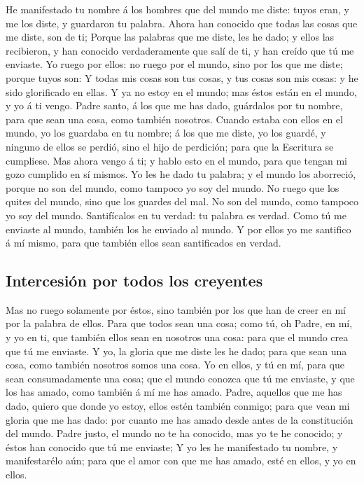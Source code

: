  He manifestado tu nombre á los hombres que del mundo me
diste: tuyos eran, y me los diste, y guardaron tu palabra. 
Ahora han conocido que todas las cosas que me diste, son de ti;
 Porque las palabras que me diste, les he dado; y ellos las
recibieron, y han conocido verdaderamente que salí de ti, y han creído
que tú me enviaste.  Yo ruego por ellos: no ruego por el
mundo, sino por los que me diste; porque tuyos son:  Y
todas mis cosas son tus cosas, y tus cosas son mis cosas: y he sido
glorificado en ellas.  Y ya no estoy en el mundo; mas éstos
están en el mundo, y yo á ti vengo. Padre santo, á los que me has dado,
guárdalos por tu nombre, para que sean una cosa, como también nosotros.
 Cuando estaba con ellos en el mundo, yo los guardaba en tu
nombre; á los que me diste, yo los guardé, y ninguno de ellos se perdió,
sino el hijo de perdición; para que la Escritura se cumpliese.
 Mas ahora vengo á ti; y hablo esto en el mundo, para que
tengan mi gozo cumplido en sí mismos.  Yo les he dado tu
palabra; y el mundo los aborreció, porque no son del mundo, como tampoco
yo soy del mundo.  No ruego que los quites del mundo, sino
que los guardes del mal.  No son del mundo, como tampoco yo
soy del mundo.  Santifícalos en tu verdad: tu palabra es
verdad.  Como tú me enviaste al mundo, también los he
enviado al mundo.  Y por ellos yo me santifico á mí mismo,
para que también ellos sean santificados en verdad.

\hypertarget{intercesiuxf3n-por-todos-los-creyentes}{%
\subsection{Intercesión por todos los
creyentes}\label{intercesiuxf3n-por-todos-los-creyentes}}

 Mas no ruego solamente por éstos, sino también por los que
han de creer en mí por la palabra de ellos.  Para que todos
sean una cosa; como tú, oh Padre, en mí, y yo en ti, que también ellos
sean en nosotros una cosa: para que el mundo crea que tú me enviaste.
 Y yo, la gloria que me diste les he dado; para que sean
una cosa, como también nosotros somos una cosa.  Yo en
ellos, y tú en mí, para que sean consumadamente una cosa; que el mundo
conozca que tú me enviaste, y que los has amado, como también á mí me
has amado.  Padre, aquellos que me has dado, quiero que
donde yo estoy, ellos estén también conmigo; para que vean mi gloria que
me has dado: por cuanto me has amado desde antes de la constitución del
mundo.  Padre justo, el mundo no te ha conocido, mas yo te
he conocido; y éstos han conocido que tú me enviaste;  Y yo
les he manifestado tu nombre, y manifestarélo aún; para que el amor con
que me has amado, esté en ellos, y yo en ellos.

